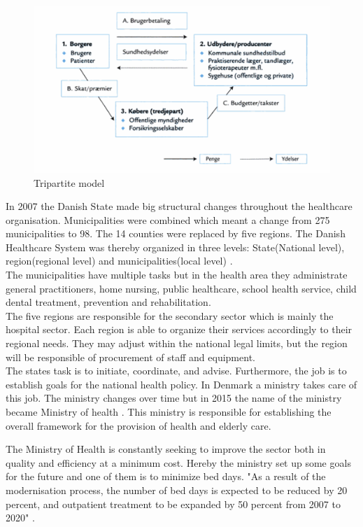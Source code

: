 \begin{figure}[H]
\centering
\includegraphics[width=1\textwidth]{Figure/tredjepart.png}
\caption{Tripartite model \cite{sundhedsvaesen}}
\label{Trepartmodel}
\end{figure} 

In 2007 the Danish State made big structural changes throughout the healthcare organisation. Municipalities were combined which meant a change from 275 municipalities to 98. The 14 counties were replaced by five regions. The Danish Healthcare System was thereby organized in three levels: State(National level), region(regional level) and municipalities(local level) \cite{indenrigs, Healthcareindk2}.\\
The municipalities have multiple tasks but in the health area they administrate general practitioners, home nursing, public healthcare, school health service, child dental treatment, prevention and rehabilitation\cite{sundhedsministeriet}. \\
The five regions are responsible for the secondary sector which is mainly the hospital sector. Each region is able to organize their services accordingly to their regional needs. They may adjust within the national legal limits, but the region will be responsible of procurement of staff and equipment.\\
The states task is to initiate, coordinate, and advise. Furthermore, the job is to establish goals for the national health policy\cite{sundhedsministeriet}. In Denmark a ministry takes care of this job. The ministry changes over time but in 2015 the name of the ministry became Ministry of health \cite{ministryofhealth}. This ministry is responsible for establishing the overall framework for the provision of health and elderly care.

The Ministry of Health is constantly seeking to improve the sector both in quality and efficiency at a minimum cost. Hereby the ministry set up some goals for the future and one of them is to minimize bed days. "As a result of the modernisation process, the number of bed days is expected to be reduced by 20 percent, and outpatient treatment to be expanded by 50 percent from 2007 to 2020" \cite{Healthcareindk2}. %


